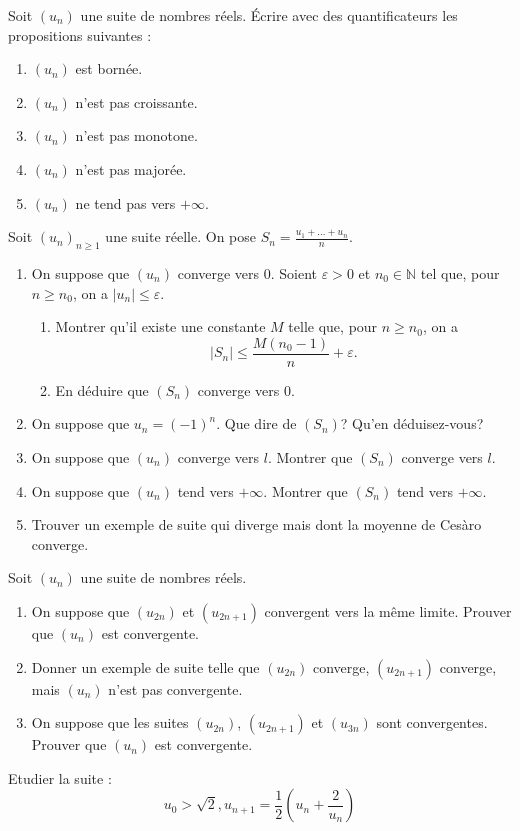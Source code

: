 \documentclass{book}
\begin{document}
\begin{Exercice}
Soit $(u_n)$ une suite de nombres réels. \'Ecrire avec des quantificateurs les propositions suivantes : 
\begin{enumerate}
\item $(u_n)$ est bornée.
\item $(u_n)$ n'est pas croissante.
\item $(u_n)$ n'est pas monotone.
\item $(u_n)$ n'est pas majorée.
\item $(u_n)$ ne tend pas vers $+\infty$.
\end{enumerate}
\end{Exercice}

\begin{Exercice}
Soit $(u_n)_{n\geq 1}$ une suite réelle. On pose $S_n=\frac{u_1+\dots+u_n}{n}$.
\begin{enumerate}
\item On suppose que $(u_n)$ converge vers 0. Soient $\varepsilon>0$ et $n_0\in\mathbb N$ tel que, pour
$n\geq n_0$, on a $|u_n|\leq\varepsilon$.
\begin{enumerate}
\item Montrer qu'il existe une constante $M$ telle que, pour $n\geq n_0$, on a 
$$|S_n|\leq \frac{M(n_0-1)}{n}+\varepsilon.$$
\item En déduire que $(S_n)$ converge vers 0.
\end{enumerate}
\item On suppose que $u_n=(-1)^n$. Que dire de $(S_n)$? Qu'en déduisez-vous?
\item On suppose que $(u_n)$ converge vers $l$. Montrer que $(S_n)$ converge vers $l$.
\item On suppose que $(u_n)$ tend vers $+\infty$. Montrer que $(S_n)$ tend vers $+\infty$.
\item Trouver un exemple de suite qui diverge mais dont la moyenne de Cesàro converge.
\end{enumerate}

\end{Exercice}

\begin{Exercice}
Soit $(u_n)$ une suite de nombres réels.
\begin{enumerate}
\item On suppose que $(u_{2n})$ et $(u_{2n+1})$ convergent vers la même limite. Prouver que $(u_n)$ est convergente.
\item Donner un exemple de suite telle que $(u_{2n})$ converge, $(u_{2n+1})$ converge, mais $(u_{n})$ n'est pas convergente.
\item On suppose que les suites $(u_{2n})$, $(u_{2n+1})$ et $(u_{3n})$ sont convergentes. Prouver que $(u_n)$ est convergente.
\end{enumerate}
\end{Exercice}


\begin{Exercice}
Etudier la suite :
  $$u_0 > \sqrt{2} , u_{n+1} = \frac12\left(u_n + \frac{2}{u_n}\right)$$
\end{Exercice}
\end{document}

